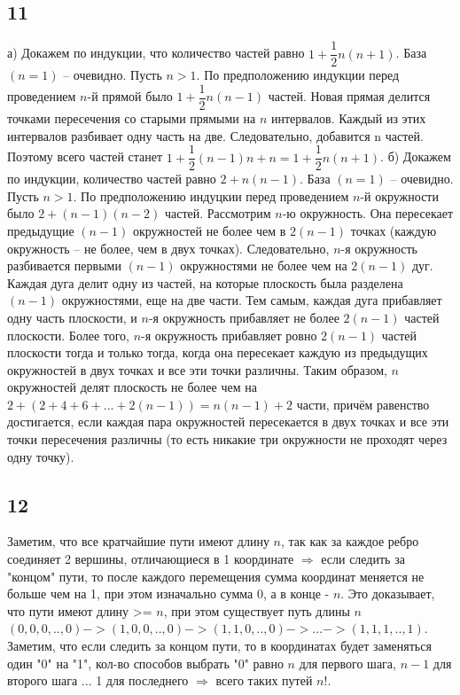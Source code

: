 		\subsection{11}
		а) Докажем по индукции, что количество частей равно $1 + \dfrac{1}{2} n (n + 1)$. \newline
		База $(n = 1)$ -- очевидно. Пусть $n > 1$. По предположению индукции перед проведением $n$-й прямой было $1 +  \dfrac{1}{2}n(n - 1)$ частей. Новая прямая делится точками пересечения со старыми прямыми на $n$ интервалов. Каждый из этих интервалов разбивает одну часть на две. Следовательно, добавится n частей. Поэтому всего частей станет  $1 + \dfrac{1}{2} (n - 1)n + n = 1 + \dfrac{1}{2} n(n + 1)$. \newline \newline
        б) Докажем по индукции, количество частей равно $2 + n(n - 1)$. \newline
        База $(n = 1)$ -- очевидно. Пусть $n > 1$. По предположению индуцкии перед проведением $n$-й окружности было $2 +  (n - 1)(n - 2)$ частей. Рассмотрим $n$-ю окружность. Она пересекает предыдущие $(n - 1)$ окружностей не более чем в $2(n - 1)$ точках (каждую окружность -- не более, чем в двух точках). Следовательно, $n$-я окружность разбивается первыми $(n - 1)$ окружностями не более чем на $2(n - 1)$ дуг. Каждая дуга делит одну из частей, на которые плоскость была разделена $(n - 1)$ окружностями, еще на две части. Тем самым, каждая дуга прибавляет одну часть плоскости, и $n$-я окружность прибавляет не более $2(n - 1)$ частей плоскости. Более того, $n$-я окружность прибавляет ровно $2(n - 1)$ частей плоскости тогда и только тогда, когда она пересекает каждую из предыдущих окружностей в двух точках и все эти точки различны. Таким образом, $n$ окружностей делят плоскость не более чем на $2 + (2 + 4 + 6 + ... + 2(n - 1)) = n(n - 1) + 2$ части, причём равенство достигается, если каждая пара окружностей пересекается в двух точках и все эти точки пересечения различны (то есть никакие три окружности не проходят через одну точку).
		
		\subsection{12}
        Заметим, что все кратчайшие пути имеют длину $n$, так как за каждое ребро соединяет 2 вершины, отличающиеся в 1 координате $\Rightarrow$ если следить за "концом" пути, то после каждого перемещения сумма координат меняется не больше чем на 1, при этом изначально сумма 0, а в конце - $n$. Это доказывает, что пути имеют длину >= $n$, при этом существует путь длины $n$
        $(0, 0, 0, .., 0) -> (1, 0, 0, .., 0) -> (1, 1, 0, .., 0) -> ... -> (1, 1, 1, .., 1)$. Заметим, что если следить за концом пути, то в координатах будет заменяться один "0" на "1", кол-во способов выбрать "0" равно $n$ для первого шага, $n - 1$ для второго шага ... 1 для последнего $\Longrightarrow$  всего таких путей $n!$.